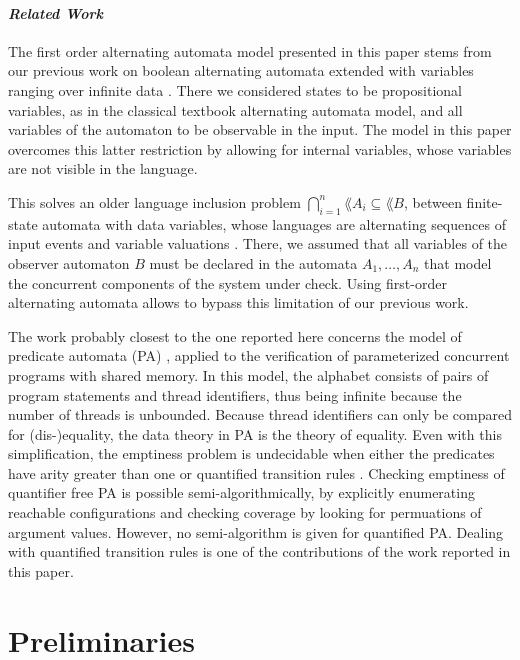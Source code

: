 \paragraph{\em Related Work} 
The first order alternating automata model presented in this paper
stems from our previous work on boolean alternating automata extended
with variables ranging over infinite data \cite{IosifXu18}. There we
considered states to be propositional variables, as in the classical
textbook alternating automata model, and all variables of the
automaton to be observable in the input. The model in this paper
overcomes this latter restriction by allowing for internal variables,
whose variables are not visible in the language. 

This solves an older language inclusion problem
$\bigcap_{i=1}^n\lang{A_i} \subseteq \lang{B}$, between finite-state
automata with data variables, whose languages are alternating
sequences of input events and variable valuations
\cite{IosifRV16}. There, we assumed that all variables of the observer
automaton $B$ must be declared in the automata $A_1, \ldots, A_n$ that
model the concurrent components of the system under check. Using
first-order alternating automata allows to bypass this limitation of
our previous work.

The work probably closest to the one reported here concerns the model
of predicate automata (PA) \cite{Farzan15,Farzan16,KincaidPhD},
applied to the verification of parameterized concurrent programs with
shared memory. In this model, the alphabet consists of pairs of
program statements and thread identifiers, thus being infinite because
the number of threads is unbounded. Because thread identifiers can
only be compared for (dis-)equality, the data theory in PA is the
theory of equality. Even with this simplification, the emptiness
problem is undecidable when either the predicates have arity greater
than one \cite{Farzan15} or quantified transition rules
\cite{KincaidPhD}. Checking emptiness of quantifier free PA is
possible semi-algorithmically, by explicitly enumerating reachable
configurations and checking coverage by looking for permuations of
argument values. However, no semi-algorithm is given for quantified
PA.  Dealing with quantified transition rules is one of the
contributions of the work reported in this paper. 

\section{Preliminaries}

